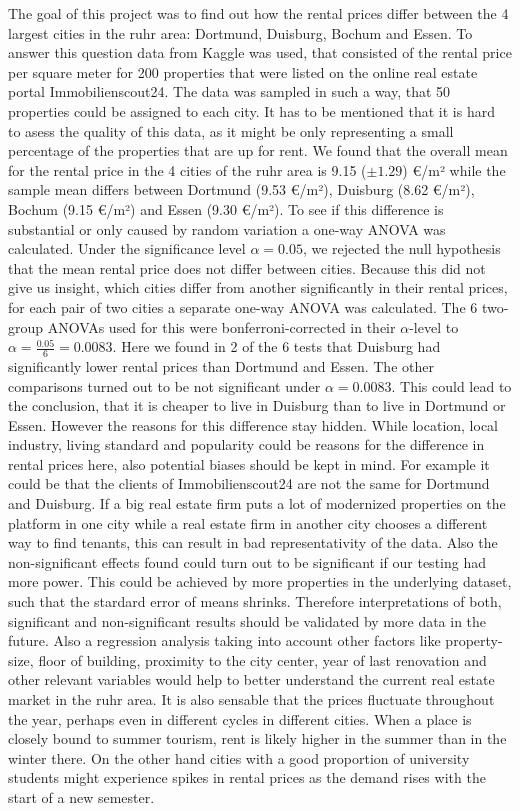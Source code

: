 \documentclass[12 pt]{scrartcl}
\begin{document}
The goal of this project was to find out how the rental prices differ between the 4 largest cities in the ruhr area: Dortmund, Duisburg, Bochum and Essen. To answer this question data from Kaggle \citep{kaggle} was used, that consisted of the rental price per square meter for 200 properties that were listed on the online real estate portal Immobilienscout24. The data was sampled in such a way, that 50 properties could be assigned to each city. It has to be mentioned that it is hard to asess the quality of this data, as it might be only representing a small percentage of the properties that are up for rent.
We found that the overall mean for the rental price in the 4 cities of the ruhr area is  9.15 ($\pm 1.29$) €/m² while the sample mean differs between Dortmund (9.53 €/m²), Duisburg (8.62 €/m²), Bochum (9.15 €/m²) and Essen (9.30 €/m²).
To see if this difference is substantial or only caused by random variation a one-way ANOVA was calculated. Under the significance level $\alpha = 0.05$, we rejected the null hypothesis that the mean rental price does not differ between cities. Because this did not give us insight, which cities differ from another significantly in their rental prices, for each pair of two cities a separate one-way ANOVA was calculated. The 6 two-group ANOVAs used for this were bonferroni-corrected in their $\alpha$-level to $\alpha = \frac{0.05}{6} = 0.0083$. Here we found in 2 of the 6 tests that Duisburg had significantly lower rental prices than Dortmund and Essen. The other comparisons turned out to be not significant under $\alpha = 0.0083$.
This could lead to the conclusion, that it is cheaper to live in Duisburg than to live in Dortmund or Essen. However the reasons for this difference stay hidden. While location, local industry, living standard and popularity could be reasons for the difference in rental prices here, also potential biases should be kept in mind. For example it could be that the clients of Immobilienscout24 are not the same for Dortmund and Duisburg. If a big real estate firm puts a lot of modernized properties on the platform in one city while a real estate firm in another city chooses a different way to find tenants, this can result in bad representativity of the data. Also the non-significant effects found could turn out to be significant if our testing had more power. This could be achieved by more properties in the underlying dataset, such that the stardard error of means shrinks. Therefore interpretations of both, significant and non-significant results should be validated by more data in the future. Also a regression analysis taking into account other factors like property-size, floor of building, proximity to the city center, year of last renovation and other relevant variables would help to better understand the current real estate market in the ruhr area. It is also sensable that the prices fluctuate throughout the year, perhaps even in different cycles in different cities. When a place is closely bound to summer tourism, rent is likely higher in the summer than in the winter there. On the other hand cities with a good proportion of university students might experience spikes in rental prices as the demand rises with the start of a new semester.
\end{document}
